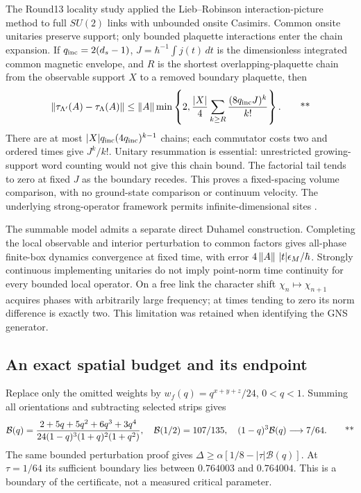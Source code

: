 The Round13 locality study applied the Lieb--Robinson interaction-picture
method to full \(SU(2)\) links with unbounded onsite Casimirs. Common onsite
unitaries preserve support; only bounded plaquette interactions enter
the chain expansion. If \(q_{\rm inc}=2(d_s-1)\),
\(J=\hbar^{-1}\int j(t)\,dt\) is the dimensionless integrated common
magnetic envelope, and \(R\) is the shortest overlapping-plaquette chain
from the observable support \(X\) to a removed boundary plaquette, then
\begin{equation}
 \left\lVert \tau_{\Lambda'}(A)-\tau_\Lambda(A)\right\rVert
 \le\left\lVert A\right\rVert\min\left\{2,\frac{|X|}{4}
                   \sum_{k\ge R}\frac{(8q_{\rm inc}J)^k}{k!}\right\}.
 \qquad\text{**}
 \label{eq:middle-lr}
\end{equation}
There are at most \(|X|q_{\rm inc}(4q_{\rm inc})^{k-1}\) chains;
each commutator costs two and ordered times give \(J^k/k!\).
Unitary resummation is essential: unrestricted growing-support word
counting would not give this chain bound. The factorial tail tends to zero
at fixed \(J\) as the boundary recedes. This proves a fixed-spacing
volume comparison, with no ground-state comparison or continuum velocity.
The underlying strong-operator framework permits infinite-dimensional
sites \cite{nachtergaele2014dynamics}.

The summable model admits a separate direct Duhamel construction.
Completing the local observable and interior perturbation to common
factors gives all-phase finite-box dynamics convergence at fixed time,
with error \(4\left\lVert A\right\rVert\,|t|\epsilon_M/\hbar\).
Strongly continuous implementing unitaries do not imply point-norm
time continuity for every bounded local operator. On a free link the
character shift \(\chi_n\mapsto\chi_{n+1}\) acquires phases with arbitrarily
large frequency; at times tending to zero its norm difference is exactly
two. This limitation was retained when identifying the GNS generator.

\subsection{An exact spatial budget and its endpoint \workstar}
\label{sec:middle-profile}

Replace only the omitted weights by \(w_f(q)=q^{x+y+z}/24\), \(0<q<1\).
Summing all orientations and subtracting selected strips gives
\begin{equation}
 \mathcal B(q)=
 \frac{2+5q+5q^2+6q^3+3q^4}
 {24(1-q)^3(1+q)^2(1+q^2)},\quad
 \mathcal B(1/2)=107/135,\quad
 (1-q)^3\mathcal B(q)\longrightarrow7/64.
 \qquad\text{**}
 \label{eq:middle-profile}
\end{equation}
The same bounded perturbation proof gives
\(\Delta\ge\alpha[1/8-|\tau|\mathcal B(q)]\).
At \(\tau=1/64\) its sufficient boundary lies between \(0.764003\)
and \(0.764004\). This is a boundary of the certificate, not a measured
critical parameter.

